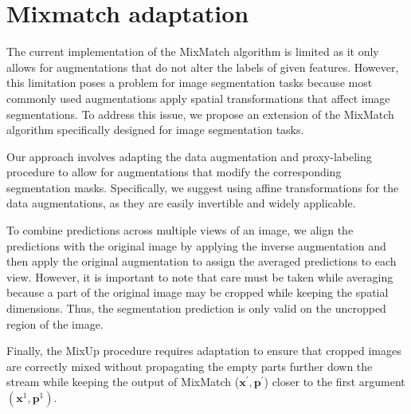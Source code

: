 \section{Mixmatch adaptation}
The current implementation of the MixMatch algorithm is limited as it only allows for augmentations that do not alter the labels of given features. 
However, this limitation poses a problem for image segmentation tasks because most commonly used augmentations apply spatial transformations 
that affect image segmentations. To address this issue, we propose an extension of the MixMatch algorithm specifically designed for image segmentation tasks.

Our approach involves adapting the data augmentation and proxy-labeling procedure to allow for augmentations that modify the corresponding 
segmentation masks. Specifically, we suggest using affine transformations for the data augmentations, as they are easily invertible and widely
applicable.

To combine predictions across multiple views of an image, we align the predictions with the original image by applying the inverse augmentation
and then apply the original augmentation to assign the averaged predictions to each view. However, it is important to note that care must be taken
while averaging because a part of the original image may be cropped while keeping the spatial dimensions. Thus, the segmentation prediction is 
only valid on the uncropped region of the image.

Finally, the MixUp procedure requires adaptation to ensure that cropped images are correctly mixed without propagating
the empty parts further down the stream while keeping the output of MixMatch ($\mathbf{x}^\prime,\mathbf{p}^\prime$) 
closer to the first argument $(\mathbf{x}^1,\mathbf{p}^1)$.

